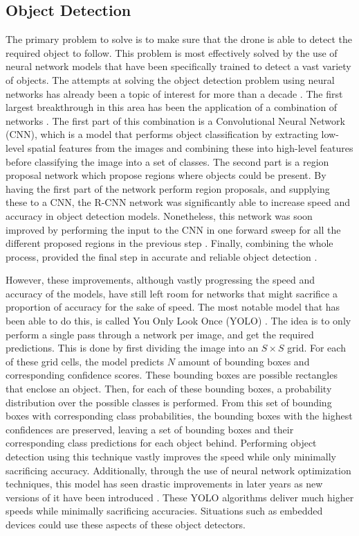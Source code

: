 \subsection{Object Detection}
The primary problem to solve is to make sure 
that the drone is able to detect the required object to follow. This problem is 
most effectively solved by the use of neural network models that have been specifically 
trained to detect a vast variety of objects. The attempts at solving the object 
detection problem using neural networks has already been a topic of interest for 
more than a decade \cite{original-rcnn}. The first largest breakthrough in this area 
has been the application of a combination of networks \cite{original-rcnn}. 
The first part of this combination is a Convolutional Neural Network (CNN), which is a model that 
performs object classification by extracting low-level 
spatial features from the images and combining these into high-level features before 
classifying the image into a set of classes. The second part is a region proposal 
network which propose regions 
where objects could be present. By having the first part of the network perform region proposals, 
and supplying these to a CNN, the R-CNN network was significantly able to increase speed and
accuracy in object detection models. Nonetheless, this network was soon improved by performing the 
input to the CNN in one forward sweep for all the different proposed regions in the 
previous step \cite{fastrcnn}. Finally, combining the whole process, provided the final 
step in accurate and reliable object detection \cite{fasterrcnn}. 

However, these improvements, although vastly progressing the speed and accuracy of the 
models, have still left room for networks that might sacrifice a proportion of accuracy 
for the sake of speed. The most notable model that has been able to do this, is called 
You Only Look Once (YOLO) \cite{originalyolo}. The idea is to only perform a single pass 
through a network per image, and get the required predictions. This is done by first 
dividing the image into an $S \times S$ grid. For each of these grid cells, the model 
predicts $N$ amount of bounding boxes and corresponding confidence scores. These 
bounding boxes are possible rectangles that enclose an object. Then, for each of these 
bounding boxes, a probability distribution over the possible classes is performed. 
From this set of bounding boxes with corresponding class probabilities, the bounding 
boxes with the highest confidences are preserved, leaving a set of bounding boxes and 
their corresponding class predictions for each object behind. Performing object detection 
using this technique vastly improves the speed while only minimally sacrificing accuracy.
Additionally, through the use of neural network optimization techniques, this model has 
seen drastic improvements in later years as new versions of it have been introduced \cite{yolo9000,yolov3, YOLOv4}.
These YOLO algorithms deliver much higher speeds while minimally sacrificing accuracies. 
Situations such as embedded devices could use these aspects of these object detectors. 

